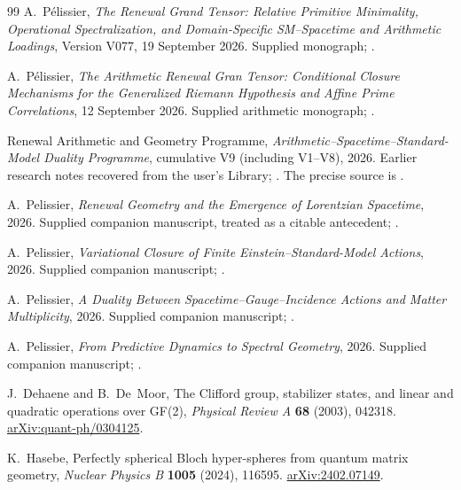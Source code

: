 \documentclass[11pt]{article}
\theoremstyle{definition}
\theoremstyle{remark}
\begin{document}
\begin{thebibliography}{99}
\setlength{\itemsep}{2pt}
\setlength{\parsep}{0pt}
A.~P\'elissier,
\emph{The Renewal Grand Tensor: Relative Primitive Minimality, Operational
Spectralization, and Domain-Specific SM--Spacetime and Arithmetic Loadings},
Version V077, 19 September 2026. Supplied monograph;
.

A.~P\'elissier,
\emph{The Arithmetic Renewal Gran Tensor: Conditional Closure Mechanisms for
the Generalized Riemann Hypothesis and Affine Prime Correlations},
12 September 2026. Supplied arithmetic monograph;
.

Renewal Arithmetic and Geometry Programme,
\emph{Arithmetic--Spacetime--Standard-Model Duality Programme},
cumulative V9 (including V1--V8), 2026. Earlier research notes recovered from
the user's Library;
.
The precise source is .

A.~Pelissier,
\emph{Renewal Geometry and the Emergence of Lorentzian Spacetime},
2026. Supplied companion manuscript, treated as a citable antecedent;
.

A.~Pelissier,
\emph{Variational Closure of Finite Einstein--Standard-Model Actions},
2026. Supplied companion manuscript;
.

A.~Pelissier,
\emph{A Duality Between Spacetime--Gauge--Incidence Actions and Matter
Multiplicity}, 2026. Supplied companion manuscript;
.

A.~Pelissier,
\emph{From Predictive Dynamics to Spectral Geometry},
2026. Supplied companion manuscript;
.

J.~Dehaene and B.~De~Moor,
The Clifford group, stabilizer states, and linear and quadratic operations
over GF(2), \emph{Physical Review A} \textbf{68} (2003), 042318.
\href{https://arxiv.org/abs/quant-ph/0304125}{arXiv:quant-ph/0304125}.

K.~Hasebe,
Perfectly spherical Bloch hyper-spheres from quantum matrix geometry,
\emph{Nuclear Physics B} \textbf{1005} (2024), 116595.
\href{https://arxiv.org/abs/2402.07149}{arXiv:2402.07149}.


\end{thebibliography}
\end{document}
